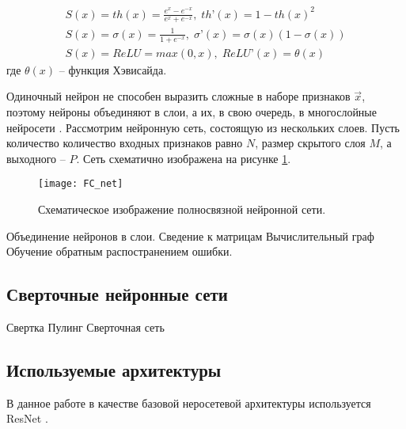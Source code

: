 \begin{equation}\label{eq:activations}
	\begin{gathered}
	    S(x) = th(x) = \frac{e^x - e^{-x}}{e^x + e^{-x}},    \;   th’(x) = 1 - th(x)^2   \\    
	    S(x) = \sigma(x) = \frac{1}{1 + e^{-x}},   \;   \sigma’(x) = \sigma(x)(1 - \sigma(x)) \\
	    S(x) = ReLU = max(0, x),   \;   ReLU’(x) = \theta(x)
	\end{gathered}
\end{equation}
где $\theta(x)$ -- функция Хэвисайда.


\indent
Одиночный нейрон не способен выразить сложные в наборе
признаков $\vec{x}$, поэтому нейроны объединяют в слои, а их, в свою 
очередь, в многослойные нейросети . Рассмотрим нейронную сеть,
состоящую из нескольких слоев. Пусть количество количество входных признаков
равно $N$, размер скрытого слоя $M$, а выходного -- $P$. Сеть схематично
изображена на рисунке \ref{tikzpicture: fc_net}.
 
 
\begin{figure}[h!]
    \begin{center}
   	    \texttt{[image: FC\_net]}
   	\end{center}
   	\caption{Схематическое изображение полносвязной нейронной сети.}
   	\label{tikzpicture: fc_net}
\end{figure}


 Объединение нейронов в слои.
 Сведение к матрицам
 Вычислительный граф
 Обучение обратным распостранением ошибки.
 
 
\subsection{Сверточные нейронные сети}
Свертка
Пулинг
Сверточная сеть


\subsection{Используемые архитектуры}
В данное работе в качестве базовой неросетевой архитектуры используется
ResNet \cite{resnet}.
